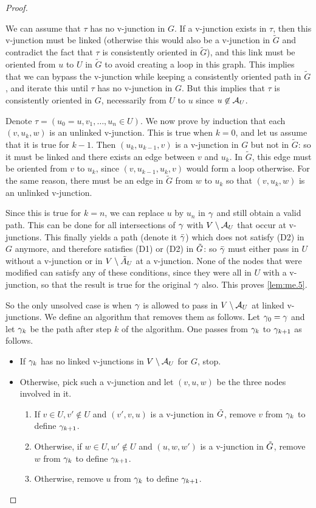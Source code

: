 \begin{proof}
\begin{enumerate}[label={\it Step \arabic*.}]
We can assume that $\tau$ has no v-junction in $G$. If a v-junction
exists in $\tau$,
then this v-junction must be linked (otherwise this would also be a
v-junction in $\tilde G$ and contradict the fact that $\tau$ is
consistently oriented in $\tilde G$), and this link must be oriented
from $u$ to $U$ in $\tilde G$ to avoid creating a loop in this
graph. This implies that we can bypass the v-junction while keeping a
consistently oriented path in $\tilde G$, and iterate this until
$\tau$ has no v-junction in $G$. But this implies that $\tau$ is
consistently oriented in $G$, necessarily from $U$ to $u$ since
$u \not\in {\mathcal A}_U$.

Denote $\tau = (u_0=u, v_1, \ldots,
u_n\in U)$. We now prove by induction that each $(v, u_k, w)$ is an unlinked
v-junction. This is true when $k=0$, and let us assume that it is true
for $k-1$. Then $(u_{k}, u_{k-1}, v)$ is a v-junction in $G$ but not
in $\tilde G$: so it must be linked and there exists an edge between
$v$ and $u_k$. In $\tilde G$, this edge must be oriented from $v$
to $u_k$, since $(v, u_{k-1}, u_k, v)$ would form a loop
otherwise. For the same reason, there must be an edge in $\tilde G$
from $w$ to $u_k$ so that $(v, u_k, w)$ is an unlinked
v-junction. 

Since this is true for $k=n$, we can replace $u$ by $u_n$ in $\gamma$
and still obtain a valid path. This can be done for all 
intersections of $\gamma$ with $V\setminus {\mathcal A}_U$ that occur at
v-junctions. This finally yields a path (denote it
$\bar{\gamma}$) which does not satisfy (D2) in $G$ anymore, and therefore
satisfies (D1) or (D2) in ${\tilde{G}}$: so  $\bar{\gamma}$
must either pass in $U$ without a v-junction or in $V\setminus \tilde A_U$
at a v-junction. None of the  nodes that were modified can satisfy any of these
conditions, since they were all in $U$ with a v-junction, so that the
result is true for the original $\gamma$ also. This proves 
\cref{lem:me.5}.

So the only unsolved case is when $\gamma$ is allowed to pass in $V\setminus
{\mathcal A}_U$ at linked v-junctions. We define an algorithm that removes them
as follows. Let $\gamma_0=\gamma$ and let $\gamma_k$ be the path after step $k$ of
the algorithm. One passes from $\gamma_k$ to $\gamma_{k+1}$ as follows.
\begin{itemize}
\item If $\gamma_k$ has no linked v-junctions in $V\setminus {\mathcal A}_U$ for $G$,
  stop.
\item Otherwise, pick such a v-junction and let $(v,u,w)$ be the
  three nodes involved in it.
\begin{enumerate}[label=(\roman*),labelindent=0.5cm, leftmargin=.5cm]
\item If $v\in U, v'\not\in U$ and $(v', v, u)$ is a v-junction in ${\tilde{G}}$, remove
  $v$ from $\gamma_k$ to define $\gamma_{k+1}$.
\item Otherwise,  if  $w\in U, w'\not\in U$ and $(u,w, w')$ is a v-junction in ${\tilde{G}}$, remove
  $w$ from $\gamma_k$ to define $\gamma_{k+1}$.
\item Otherwise, remove $u$ from $\gamma_k$ to define $\gamma_{k+1}$.
\end{enumerate}
\end{itemize}


\end{enumerate}
\end{proof}
